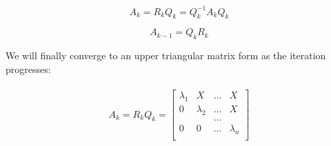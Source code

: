 \documentclass{article}
\begin{document}
$$A_k = R_kQ_k = Q^{-1}_kA_kQ_k$$

$$A_{k-1}=Q_kR_k$$

We will finally converge to an upper triangular matrix form as the iteration progresses:

\begin{align*}
\begin{split} A_k = R_kQ_k = \begin{bmatrix}
\lambda_1 & X & \dots & X\\
0 & \lambda_2 & \dots & X\\
& &\dots &\\
0 & 0 & \dots & \lambda_n\\
\end{bmatrix}\end{split}
\end{align*}
\end{document}
